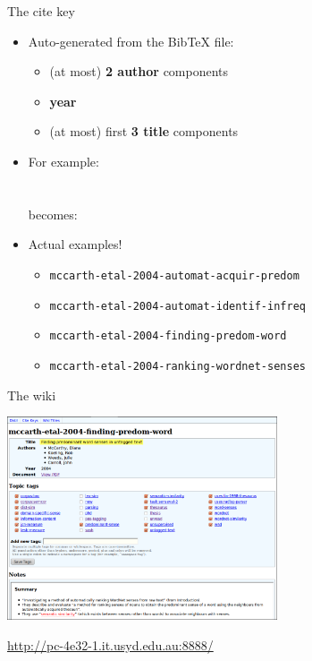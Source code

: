 \documentclass[sansserif]{beamer}
\begin{document}
\begin{frame}{The cite key}
	\begin{itemize}
		\item Auto-generated from the BibTeX file:
		\begin{itemize}
			\item (at most) \textbf{2 author} components
			\item \textbf{year}
			\item (at most) first \textbf{3 title} components
		\end{itemize}
		\item For example:
		\\ \hspace{1em}{\small ``Finding predominant word senses in untagged text''}
		\\ \hspace{2em}{\small by McCarthy et al (2004)}
		\\ becomes:
		\\ \hspace{2em}{\tt mccarth-etal-2004-finding-predom-word} \vspace{1em}
		\item Actual examples!
		\begin{itemize}
			\item {\tt mccarth-etal-2004-automat-acquir-predom}
			\item {\tt mccarth-etal-2004-automat-identif-infreq}
			\item {\tt mccarth-etal-2004-finding-predom-word}
			\item {\tt mccarth-etal-2004-ranking-wordnet-senses}
		\end{itemize}
	\end{itemize}
\end{frame}

\begin{frame}{The wiki}
	\begin{center}
		\includegraphics[width=8cm]{screenshot.png}
	\end{center}
	\begin{center}
		\url{http://pc-4e32-1.it.usyd.edu.au:8888/}
	\end{center}
\end{frame}
\end{document}
